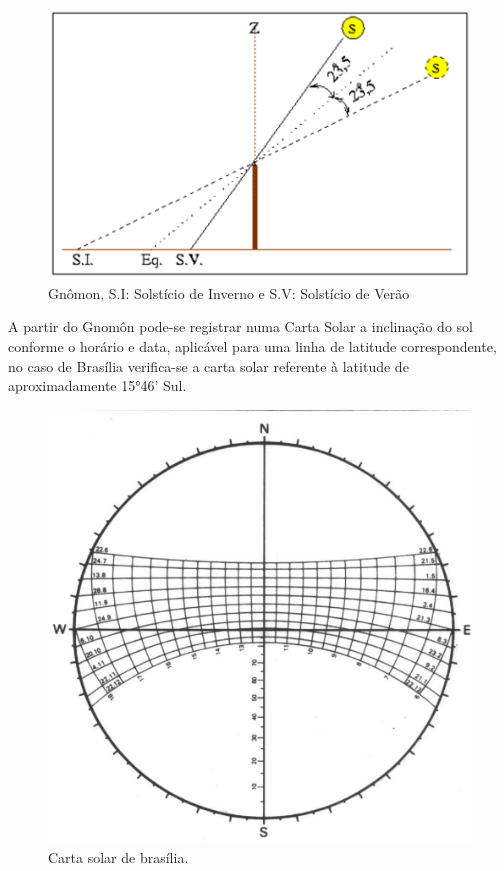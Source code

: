 \begin{figure}[H]
  \begin{center}
	\includegraphics[keepaspectratio,scale=1,angle=0]{figuras/inclinacao.eps}
	\caption{Gnômon, S.I: Solstício de Inverno e S.V: Solstício de Verão
}
  \end{center}
\end{figure}

A partir do Gnomôn pode-se registrar numa Carta Solar a inclinação do sol conforme o horário e data, aplicável para uma linha de latitude correspondente, no caso de Brasília verifica-se a carta solar referente à latitude de aproximadamente 15°46’ Sul.

\begin{figure}[H]
  \begin{center}
	\includegraphics[keepaspectratio,scale=0.3,angle=0]{figuras/bioclimatico.eps}
	\caption{Carta solar de brasília. 
}
  \end{center}
\end{figure}


